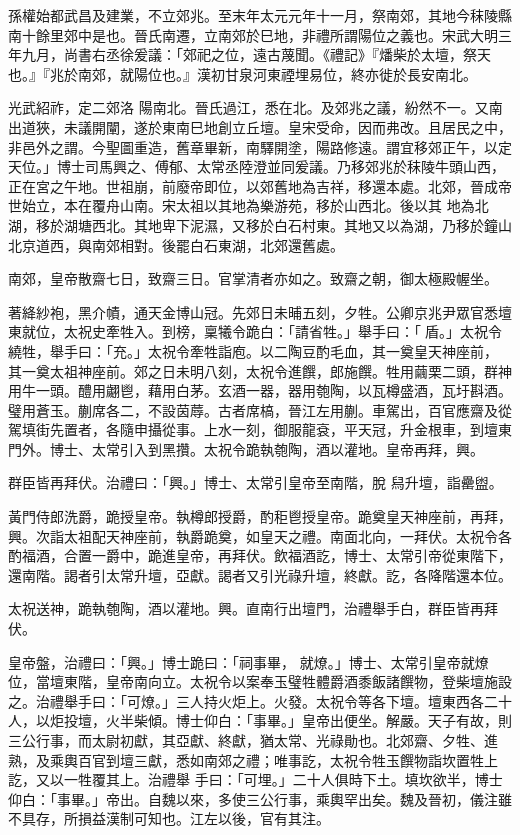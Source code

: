\begin{pinyinscope}
 孫權始都武昌及建業，不立郊兆。至末年太元元年十一月，祭南郊，其地今秣陵縣南十餘里郊中是也。晉氏南遷，立南郊於巳地，非禮所謂陽位之義也。宋武大明三年九月，尚書右丞徐爰議：「郊祀之位，遠古蔑聞。《禮記》『燔柴於太壇，祭天也。』『兆於南郊，就陽位也。』漢初甘泉河東禋埋易位，終亦徙於長安南北。



 光武紹祚，定二郊洛
 陽南北。晉氏過江，悉在北。及郊兆之議，紛然不一。又南出道狹，未議開闡，遂於東南巳地創立丘壇。皇宋受命，因而弗改。且居民之中，非邑外之謂。今聖圖重造，舊章畢新，南驛開塗，陽路修遠。謂宜移郊正午，以定天位。」博士司馬興之、傅郁、太常丞陸澄並同爰議。乃移郊兆於秣陵牛頭山西，正在宮之午地。世祖崩，前廢帝即位，以郊舊地為吉祥，移還本處。北郊，晉成帝世始立，本在覆舟山南。宋太祖以其地為樂游苑，移於山西北。後以其
 地為北湖，移於湖塘西北。其地卑下泥濕，又移於白石村東。其地又以為湖，乃移於鐘山北京道西，與南郊相對。後罷白石東湖，北郊還舊處。



 南郊，皇帝散齋七日，致齋三日。官掌清者亦如之。致齋之朝，御太極殿幄坐。



 著絳紗袍，黑介幘，通天金博山冠。先郊日未晡五刻，夕牲。公卿京兆尹眾官悉壇東就位，太祝史牽牲入。到榜，稟犧令跪白：「請省牲。」舉手曰：「盾。」太祝令繞牲，舉手曰：「充。」太祝令牽牲詣庖。以二陶豆酌毛血，其一奠皇天神座前，
 其一奠太祖神座前。郊之日未明八刻，太祝令進饌，郎施饌。牲用繭栗二頭，群神用牛一頭。醴用翽鬯，藉用白茅。玄酒一器，器用匏陶，以瓦樽盛酒，瓦圩斟酒。璧用蒼玉。蒯席各二，不設茵蓐。古者席槁，晉江左用蒯。車駕出，百官應齋及從駕填街先置者，各隨申攝從事。上水一刻，御服龍袞，平天冠，升金根車，到壇東門外。博士、太常引入到黑攢。太祝令跪執匏陶，酒以灌地。皇帝再拜，興。



 群臣皆再拜伏。治禮曰：「興。」博士、太常引皇帝至南階，脫
 舄升壇，詣罍盥。



 黃門侍郎洗爵，跪授皇帝。執樽郎授爵，酌秬鬯授皇帝。跪奠皇天神座前，再拜，興。次詣太祖配天神座前，執爵跪奠，如皇天之禮。南面北向，一拜伏。太祝令各酌福酒，合置一爵中，跪進皇帝，再拜伏。飲福酒訖，博士、太常引帝從東階下，還南階。謁者引太常升壇，亞獻。謁者又引光祿升壇，終獻。訖，各降階還本位。



 太祝送神，跪執匏陶，酒以灌地。興。直南行出壇門，治禮舉手白，群臣皆再拜伏。



 皇帝盤，治禮曰：「興。」博士跪曰：「祠事畢，
 就燎。」博士、太常引皇帝就燎位，當壇東階，皇帝南向立。太祝令以案奉玉璧牲體爵酒黍飯諸饌物，登柴壇施設之。治禮舉手曰：「可燎。」三人持火炬上。火發。太祝令等各下壇。壇東西各二十人，以炬投壇，火半柴傾。博士仰白：「事畢。」皇帝出便坐。解嚴。天子有故，則三公行事，而太尉初獻，其亞獻、終獻，猶太常、光祿勛也。北郊齋、夕牲、進熟，及乘輿百官到壇三獻，悉如南郊之禮；唯事訖，太祝令牲玉饌物詣坎置牲上訖，又以一牲覆其上。治禮舉
 手曰：「可埋。」二十人俱時下土。填坎欲半，博士仰白：「事畢。」帝出。自魏以來，多使三公行事，乘輿罕出矣。魏及晉初，儀注雖不具存，所損益漢制可知也。江左以後，官有其注。




\end{pinyinscope}

